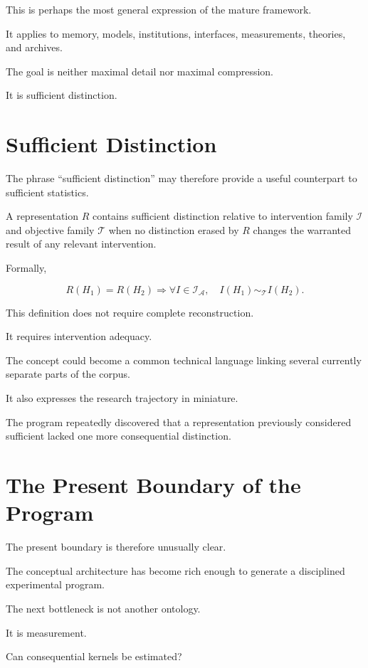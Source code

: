 \documentclass[11pt]{article}
\theoremstyle{remark}
\newcommand{\Adm}{\mathcal{A}}
\begin{document}
This is perhaps the most general expression of the mature framework.

It applies to memory, models, institutions, interfaces, measurements, theories, and archives.

The goal is neither maximal detail nor maximal compression.

It is sufficient distinction.

\section{Sufficient Distinction}

The phrase ``sufficient distinction'' may therefore provide a useful counterpart to sufficient statistics.

A representation $R$ contains sufficient distinction relative to intervention family $\mathcal{I}$ and objective family $\mathcal{T}$ when no distinction erased by $R$ changes the warranted result of any relevant intervention.

Formally,

\begin{equation}
R(H_1)=R(H_2)
\Rightarrow
\forall I\in\mathcal{I}_{\Adm},
\quad
I(H_1)\sim_{\mathcal{T}}I(H_2).
\end{equation}

This definition does not require complete reconstruction.

It requires intervention adequacy.

The concept could become a common technical language linking several currently separate parts of the corpus.

It also expresses the research trajectory in miniature.

The program repeatedly discovered that a representation previously considered sufficient lacked one more consequential distinction.

\section{The Present Boundary of the Program}

The present boundary is therefore unusually clear.

The conceptual architecture has become rich enough to generate a disciplined experimental program.

The next bottleneck is not another ontology.

It is measurement.

Can consequential kernels be estimated?
\end{document}
